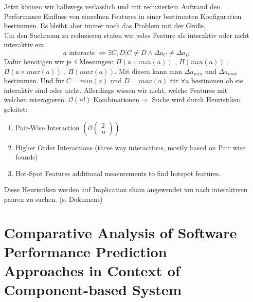 \documentclass{article}
\begin{document}
	Jetzt können wir halbwegs verlässlich und mit reduziertem Aufwand den Performance Einfluss von einzelnen Features in einer bestimmten Konfiguration bestimmen. Es bleibt aber immer noch das Problem mit der Größe.\\
	Um den Suchraum zu reduzieren stufen wir jedes Feature als interaktiv oder nicht interaktiv ein. 
		\begin{equation*}
		 a \text{ interacts } \Leftrightarrow \exists C,D | C \neq D \land \Delta a_C \neq \Delta a_D
		\end{equation*}
	Dafür benötigen wir je 4 Messungen: $\Pi(a \times min(a))$ , $\Pi(min(a))$ , $\Pi(a \times max(a))$ , $\Pi(max(a))$. Mit diesen kann man $\Delta a_{min}$ und $\Delta a_{max}$ bestimmen.
	Und für $C=min(a)$ und $D = max(a)$ für $\forall a$ bestimmen ob sie interaktiv sind oder nicht.
	Allerdings wissen wir nicht, welche Features mit welchen interagieren. $\mathcal{O}(n!) \text{ Kombinationen}\Rightarrow$ Suche wird durch Heuristiken geleitet: \\
	\begin{enumerate}
		\item Pair-Wise Interaction $(\mathcal{O}\left(\begin{smallmatrix}
		2\\
		n
		\end{smallmatrix}\right))$
		\item Higher Order Interactions (three way interactions, mostly based on Pair wise founds)
		\item Hot-Spot Features additional measurements to find hotspot features.
	\end{enumerate}
	Diese Heuristiken werden auf Implication chain angewendet um nach interaktiven paaren zu suchen. (s. Dokument)
	
	 
	\section{Comparative Analysis of Software Performance Prediction Approaches in Context of Component-based System \cite{ComparativeanalysisAbdelaziz112011}}
	
	\nocite{*}
	
	
\end{document}
